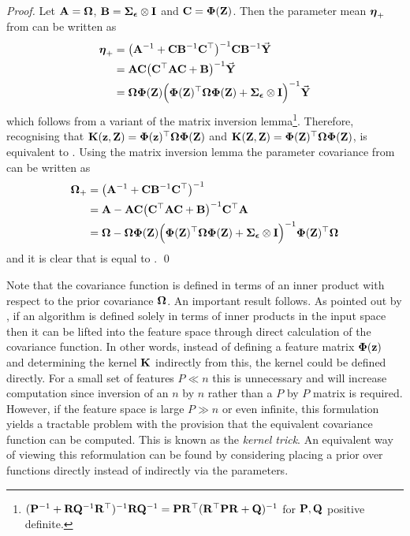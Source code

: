 \begin{proof}
Let $\mathbf{A} = \boldsymbol{\Omega}$, $\mathbf{B} = \boldsymbol{\Sigma}_{\boldsymbol{\epsilon}}\otimes\mathbf{I}$ and $\mathbf{C} = \boldsymbol{\Phi}(\mathbf{Z})$.  Then the parameter mean $\boldsymbol{\eta}_+$ from  can be written as
\begin{align*}
\boldsymbol{\eta}_+ &= \big( \mathbf{A}^{-1} + \mathbf{C}\mathbf{B}^{-1}\mathbf{C}^\top \big)^{-1} \mathbf{C}\mathbf{B}^{-1} \vec{\mathbf{Y}} \\
&= \mathbf{A}\mathbf{C} \big(  \mathbf{C}^\top\mathbf{A}\mathbf{C} + \mathbf{B} \big)^{-1} \vec{\mathbf{Y}} \\
&= \boldsymbol{\Omega}\boldsymbol{\Phi}(\mathbf{Z}) \Big( \boldsymbol{\Phi}(\mathbf{Z})^\top\boldsymbol{\Omega}\boldsymbol{\Phi}(\mathbf{Z}) + \boldsymbol{\Sigma}_{\boldsymbol{\epsilon}}\otimes\mathbf{I} \Big)^{-1}  \vec{\mathbf{Y}}
\end{align*}
which follows from a variant of the matrix inversion lemma\footnote{$(\mathbf{P}^{-1} + \mathbf{R}\mathbf{Q}^{-1}\mathbf{R}^\top)^{-1}\mathbf{R}\mathbf{Q}^{-1} = \mathbf{P}\mathbf{R}^\top(\mathbf{R}^\top\mathbf{P}\mathbf{R} + \mathbf{Q})^{-1}$ for $\mathbf{P}, \mathbf{Q}$ positive definite.}.
Therefore, recognising that $\mathbf{K}(\mathbf{z},\mathbf{Z}) = \boldsymbol{\Phi}(\mathbf{z})^\top\boldsymbol{\Omega}\boldsymbol{\Phi}(\mathbf{Z})$ and $\mathbf{K}(\mathbf{Z},\mathbf{Z}) = \boldsymbol{\Phi}(\mathbf{Z})^\top\boldsymbol{\Omega}\boldsymbol{\Phi}(\mathbf{Z})$,  is equivalent to . Using the matrix inversion lemma the parameter covariance from  can be written as
\begin{align*}
\boldsymbol{\Omega}_+ &= \big( \mathbf{A}^{-1} + \mathbf{C}\mathbf{B}^{-1}\mathbf{C}^\top \big)^{-1} \\
&= \mathbf{A} - \mathbf{A}\mathbf{C} \big(  \mathbf{C}^\top\mathbf{A}\mathbf{C} + \mathbf{B} \big)^{-1} \mathbf{C}^\top\mathbf{A} \\
&= \boldsymbol{\Omega} - \boldsymbol{\Omega}\boldsymbol{\Phi}(\mathbf{Z}) \Big( \boldsymbol{\Phi}(\mathbf{Z})^\top\boldsymbol{\Omega}\boldsymbol{\Phi}(\mathbf{Z}) + \boldsymbol{\Sigma}_{\boldsymbol{\epsilon}}\otimes\mathbf{I} \Big)^{-1} \boldsymbol{\Phi}(\mathbf{Z})^\top\boldsymbol{\Omega}
\end{align*}
and it is clear that  is equal to .
\qed
\end{proof}

Note that the covariance function is defined in terms of an inner product with respect to the prior covariance $\boldsymbol{\Omega}$. An important result follows. As pointed out by \cite{RaWi06}, if an algorithm is defined solely in terms of inner products in the input space then it can be lifted into the feature space through direct calculation of the covariance function. In other words, instead of defining a feature matrix $\boldsymbol{\Phi}(\mathbf{z})$ and determining the kernel $\mathbf{K}$ indirectly from this, the kernel could be defined directly. For a small set of features $P \ll n$ this is unnecessary and will increase computation since inversion of an $n$ by $n$ rather than a $P$ by $P$ matrix is required. However, if the feature space is large $P \gg n$ or even infinite, this formulation yields a tractable problem with the provision that the equivalent covariance function can be computed. This is known as the \textit{kernel trick}.
An equivalent way of viewing this reformulation can be found by considering placing a prior over functions directly instead of indirectly via the parameters. 











